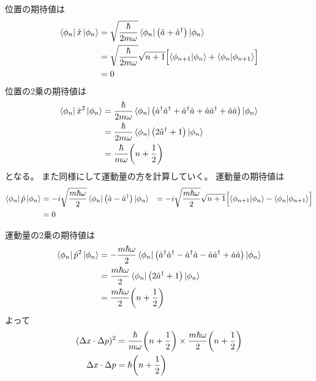 \documentclass[../../master.tex]{subfiles}
\begin{document}
\subsection{}
位置の期待値は
\begin{equation}
    \begin{aligned}[b]
        \bra{\phi_n}\hat{x}\ket{\phi_n}
        &=\sqrt{\frac{\hbar}{2m\omega}}\bra{\phi_n}\qty(\hat{a}+\hat{a}^\dagger)\ket{\phi_n}\\
        &=\sqrt{\frac{\hbar}{2m\omega}}\sqrt{n+1}\Bigl[\bra{\phi_{n+1}}\ket{\phi_n}+\bra{\phi_{n}}\ket{\phi_{n+1}}\Bigr]\\
        &=0
    \end{aligned}
\end{equation}
位置の2乗の期待値は
\begin{equation}
    \begin{aligned}[b]
        \bra{\phi_n}\hat{x}^2\ket{\phi_n}
        &=\frac{\hbar}{2m\omega}\bra{\phi_n}\qty(
            \hat{a}^\dagger\hat{a}^\dagger+\hat{a}^\dagger\hat{a}+\hat{a}\hat{a}^\dagger+\hat{a}\hat{a})
            \ket{\phi_n}\\
        &= \frac{\hbar}{2m\omega}\bra{\phi_n}\qty(2\hat{a}^\dagger + 1)\ket{\phi_n}\\
        &= \frac{\hbar}{m\omega}\qty(n+\frac{1}{2})
    \end{aligned}
\end{equation}
となる。
また同様にして運動量の方を計算していく。
運動量の期待値は
\begin{equation}\begin{aligned}[b]
    \bra{\phi_n}\hat{p}\ket{\phi_n}
    &= -i\sqrt{\frac{m\hbar\omega}{2}}\bra{\phi_n}\qty(\hat{a}-\hat{a}^\dagger)\ket{\phi_n}
    &= -i\sqrt{\frac{m\hbar\omega}{2}}\sqrt{n+1}\Bigl[\bra{\phi_{n+1}}\ket{\phi_n}-\bra{\phi_{n}}\ket{\phi_{n+1}}\Bigr]\\
    &= 0
\end{aligned}\end{equation}

運動量の2乗の期待値は
\begin{equation}\begin{aligned}[b]
    \bra{\phi_n}\hat{p}^2\ket{\phi_n}
    &=-\frac{m\hbar\omega}{2}\bra{\phi_n}\qty(
        \hat{a}^\dagger\hat{a}^\dagger-\hat{a}^\dagger\hat{a}-\hat{a}\hat{a}^\dagger+\hat{a}\hat{a})
        \ket{\phi_n}\\
    &= \frac{m\hbar\omega}{2}\bra{\phi_n}\qty(2\hat{a}^\dagger + 1)\ket{\phi_n}\\
    &= \frac{m\hbar\omega}{2}\qty(n+\frac{1}{2})
\end{aligned}\end{equation}
よって
\begin{equation}\begin{aligned}[b]
    (\Delta x\cdot \Delta p)^2 &= \frac{\hbar}{m\omega}\qty(n+\frac{1}{2})\times\frac{m\hbar\omega}{2}\qty(n+\frac{1}{2})\\
    \Delta x\cdot \Delta p &= \hbar\qty(n+\frac{1}{2})
\end{aligned}\end{equation}
\end{document}

